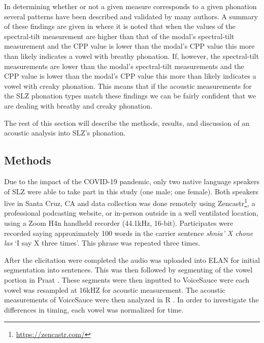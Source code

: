 \documentclass[12pt, letterpaper]{article}
\begin{document}
In determining whether or not a given measure corresponds to a given phonation several patterns have been described and validated by many authors. A summary of these findings are given in \citet{garellekPhoneticsVoice2019} where it is noted that when the values of the spectral-tilt measurement are higher than that of the modal's spectral-tilt measurement and the CPP value is lower than the modal's CPP value this more than likely indicates a vowel with breathy phonation. If, however, the spectral-tilt measurements are lower than the modal's spectral-tilt measurements and the CPP value is lower than the modal's CPP value this more than likely indicates a vowel with creaky phonation. This means that if the acoustic measurements for the SLZ phonation types match these findings we can be fairly confident that we are dealing with breathy and creaky phonation. 

The rest of this section will describe the methods, results, and discussion of an acoustic analysis into SLZ's phonation. 

\subsection{Methods} \label{sec:Methods}

Due to the impact of the COVID-19 pandemic, only two native language speakers of SLZ were able to take part in this study (one male; one female). Both speakers live in Santa Cruz, CA and data collection was done remotely using Zencastr\footnote{\href{https://zencastr.com/}{https://zencastr.com/}}, a professional podcasting website, or in-person outside in a well ventilated location, using a Zoom H4n handheld recorder (44.1kHz, 16-bit). Participates were recorded saying approximately 100 words in the carrier sentence \textit{shnia' X chone las} `I say X three times'. This phrase was repeated three times. 

After the elicitation were completed the audio was uploaded into ELAN \citep{wittenburgELANProfessionalFramework2006} for initial segmentation into sentences. This was then followed by segmenting of the vowel portion in Praat \citep{boersmaPraatDoingPhonetics2021}. These segments were then inputted to VoiceSauce \citep{shueVOICESAUCEProgramVoice2009} were each vowel was resampled at 16kHZ for acoustic measurement. The acoustic measurements of VoiceSauce were then analyzed in R \citep{rcoreteamLanguageEnvironmentStatistical2021}. In order to investigate the differences in timing, each vowel was normalized for time.
\end{document}
